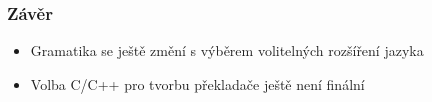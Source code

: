 \documentclass[xcolor=dvipsnames]{beamer}
\begin{document}
\begin{frame}
\frametitle{\textbf{Závěr}}
	\begin{itemize}
    		\item Gramatika se ještě změní s výběrem volitelných rozšíření jazyka
    		\item Volba C/C++ pro tvorbu překladače ještě není finální
  	\end{itemize}
\end{frame}


      
\end{document}
